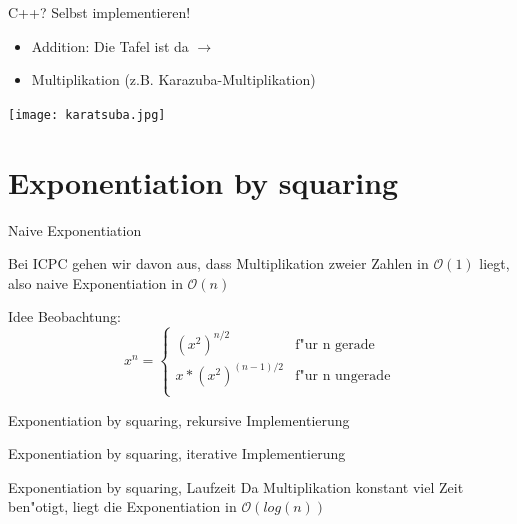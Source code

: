 \documentclass[18pt]{beamer}
\begin{document}
\begin{frame} {C++? Selbst implementieren!}
\begin {itemize}
\item Addition: Die Tafel ist da $\longrightarrow{}$
\item Multiplikation (z.B. Karazuba-Multiplikation)
\end {itemize}
\texttt{[image: karatsuba.jpg]}
\end{frame}

\section {Exponentiation by squaring}
\begin{frame} {Naive Exponentiation} 

Bei ICPC gehen wir davon aus, dass Multiplikation zweier Zahlen in $\mathcal{O}(1)$ liegt, also naive Exponentiation in $\mathcal{O}(n)$
\end{frame}

\begin{frame} {Idee}
Beobachtung:
\begin{equation}
   x^{n} =
   \begin{cases}
     (x^{2})^{n/2} & \text{f"ur n gerade} \\
      x*(x^{2})^{(n-1)/2} & \text{f"ur n ungerade} \\
   \end{cases}
\end{equation}
\end{frame}

\begin{frame} {Exponentiation by squaring, rekursive Implementierung}

\end{frame}

\begin{frame} {Exponentiation by squaring, iterative Implementierung}

\end{frame}

\begin{frame} {Exponentiation by squaring, Laufzeit}
Da Multiplikation konstant viel Zeit ben"otigt, liegt die Exponentiation in $\mathcal{O}(log(n))$
\end{frame}

\end{document}
